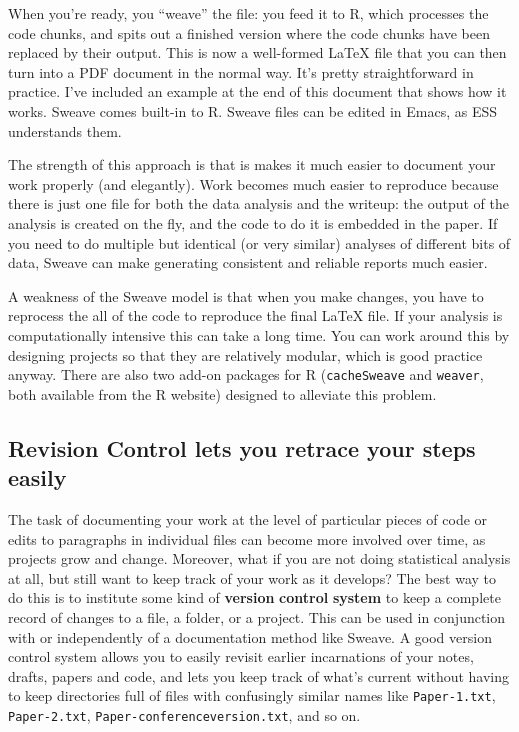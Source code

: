 \documentclass[11pt,article,oneside]{memoir}
\begin{document}
When you're ready, you ``weave'' the file: you feed it to R, which processes the code chunks, and spits out a finished version where the code chunks have been replaced by their output. This is now a well-formed LaTeX file that you can then turn into a PDF document in the normal way. It's pretty straightforward in practice. I've included an example at the end of this document that shows how it works. Sweave comes built-in to R. Sweave files can be edited in Emacs, as ESS understands them. 

The strength of this approach is that is makes it much easier to document your work properly (and elegantly). Work becomes much easier to reproduce because there is just one file for both the data analysis and the writeup: the output of the analysis is created on the fly, and the code to do it is embedded in the paper. If you need to do multiple but identical (or very similar) analyses of different bits of data, Sweave can make generating consistent and reliable reports much easier.

A weakness of the Sweave model is that when you make changes, you have to reprocess the all of the code to reproduce the final LaTeX file. If your analysis is computationally intensive this can take a long time. You can work around this by designing  projects so that they are relatively modular, which is good practice anyway. There are also two add-on packages for R (\texttt{cacheSweave} and \texttt{weaver}, both available from the R website) designed to alleviate this problem. 

\subsection{Revision Control lets you retrace your steps easily}
The task of documenting your work at the level of particular pieces of code or edits to paragraphs in individual files can become more involved over time, as projects grow and change. Moreover, what if you are not doing statistical analysis at all, but still want to keep track of your work as it develops? The best way to do this is to institute some kind of \textbf{version} \textbf{control} \textbf{system} to keep a complete record of changes to a file, a folder, or a project. This can be used in conjunction with or independently of a documentation method like Sweave. A good version control system allows you to easily revisit earlier incarnations of your notes, drafts, papers and code, and lets you keep track of what's current without having to keep directories full of files with confusingly similar names like \texttt{Paper-1.txt}, \texttt{Paper-2.txt}, \texttt{Paper-conferenceversion.txt}, and so on. 
\end{document}
